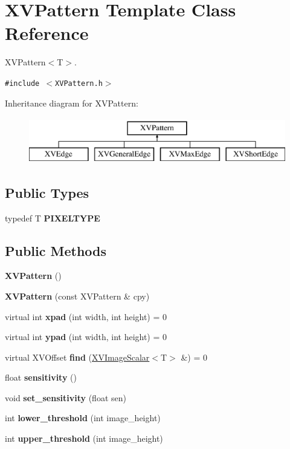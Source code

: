 \hypertarget{class_XVPattern}{
\section{XVPattern  Template Class Reference}
\label{XVPattern}
}
XVPattern$<$T$>$. 


{\tt \#include $<$XVPattern.h$>$}

Inheritance diagram for XVPattern:\begin{figure}[H]
\begin{center}
\leavevmode
\includegraphics[height=2cm]{class_XVPattern}
\end{center}
\end{figure}
\subsection*{Public Types}
\begin{CompactItemize}
\item 
typedef T {\bf PIXELTYPE}
\end{CompactItemize}
\subsection*{Public Methods}
\begin{CompactItemize}
\item 
{\bf XVPattern} ()
\item 
{\bf XVPattern} (const XVPattern \& cpy)
\item 
\label{XVPattern_a2}
\hypertarget{class_XVPattern_a2}{
virtual int {\bf xpad} (int width, int height) = 0}

\item 
\label{XVPattern_a3}
\hypertarget{class_XVPattern_a3}{
virtual int {\bf ypad} (int width, int height) = 0}

\item 
\label{XVPattern_a4}
\hypertarget{class_XVPattern_a4}{
virtual XVOffset {\bf find} (\hyperlink{class_XVImageScalar}{XVImage\-Scalar}$<$T$>$ \&) = 0}

\item 
float {\bf sensitivity} ()
\item 
void {\bf set\_\-sensitivity} (float sen)
\item 
int {\bf lower\_\-threshold} (int image\_\-height)
\item 
int {\bf upper\_\-threshold} (int image\_\-height)
\end{CompactItemize}
